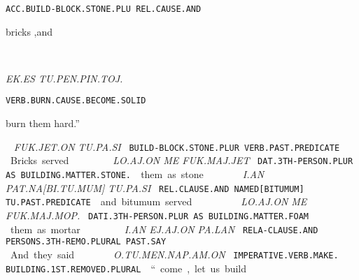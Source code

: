 {{\tt ACC.BUILD-BLOCK.STONE.PLU 	REL.CAUSE.AND		 }

bricks			,and 	 

\drie
  

\ek\es~\tu\pen\pin\toj\period

{\it EK.ES TU.PEN.PIN.TOJ.}

{\tt VERB.BURN.CAUSE.BECOME.SOLID}

burn them			hard.” 
\drie


\fuk\jet\on ~ \tu\pa\si

{\it FUK.JET.ON			TU.PA.SI			 }

{\tt BUILD-BLOCK.STONE.PLUR          VERB.PAST.PREDICATE	 }

Bricks 				served 				 
\drie

\lo\aj\on ~ \me ~\fuk\maj\jet

{\it LO.AJ.ON		ME	FUK.MAJ.JET }

{\tt DAT.3TH-PERSON.PLUR AS	BUILDING.MATTER.STONE. }

them			as 	stone	 


\drie
  

\an ~ \pat\na\cartouche{\Atlanpi\tu\mum} ~ \tu\pa\si

{\it I.AN	PAT.NA[BI.TU.MUM]	TU.PA.SI }

{\tt REL.CLAUSE.AND	NAMED[BITUMUM]	TU.PAST.PREDICATE }

and	bitumum 		served  
\drie


  

\lo\aj\on ~\me ~\fuk\maj\mop\period

{\it LO.AJ.ON			ME	FUK.MAJ.MOP. }

{\tt DATI.3TH-PERSON.PLUR               AS	BUILDING.MATTER.FOAM }

them				as 	mortar. 

\drie
  

\Atlani\an ~ \ej\aj\on ~ \pa\lan

{\it I.AN			EJ.AJ.ON			PA.LAN }

{\tt RELA-CLAUSE.AND          PERSONS.3TH-REMO.PLURAL 	PAST.SAY }

And 			they 				said  

\drie

  

\Atlano\tu\men\nap\am\on

{\it O.TU.MEN.NAP.AM.ON }

{\tt IMPERATIVE.VERB.MAKE. BUILDING.1ST.REMOVED.PLURAL	 }

“come, let us build                                                                          
\drie
 

}
